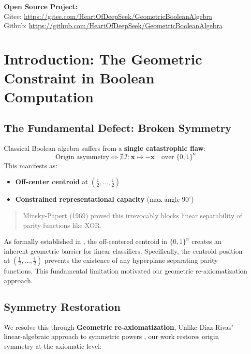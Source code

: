 \documentclass{article}
\begin{document}
\vspace{0.5em}
\noindent
\textbf{Open Source Project:} \\
\noindent
Gitee: \url{https://gitee.com/HeartOfDeepSeek/GeometricBooleanAlgebra} \\
\noindent
Github: \url{https://github.com/HeartOfDeepSeek/GeometricBooleanAlgebra}

\vspace{0.5em}




\section{Introduction: The Geometric Constraint in Boolean Computation}

\subsection{The Fundamental Defect: Broken Symmetry}
Classical Boolean algebra suffers from a \textbf{single catastrophic flaw}:
\begin{equation}
\text{Origin asymmetry} \iff \nexists \mathcal{I}: \mathbf{x} \mapsto -\mathbf{x} \quad \text{over } \{0,1\}^n
\end{equation}
This manifests as:
\begin{itemize}
\item \textbf{Off-center centroid} at $(\frac{1}{2},...,\frac{1}{2})$
\item \textbf{Constrained representational capacity} (max angle $90^\circ$)
\end{itemize}

\begin{quote}
Minsky-Papert (1969) proved this irrevocably blocks linear separability of parity functions like XOR.
\end{quote}

As formally established in \cite{minsky69perceptrons}, the off-centered centroid in $\{0,1\}^n$ creates an inherent geometric barrier for linear classifiers. Specifically, the centroid position at $(\frac{1}{2},...,\frac{1}{2})$ prevents the existence of any hyperplane separating parity functions. This fundamental limitation motivated our geometric re-axiomatization approach.

\subsection{Symmetry Restoration}
We resolve this through \textbf{Geometric re-axiomatization}, Unlike Diaz-Rivas' linear-algebraic approach to symmetric powers \cite{diaz2006symmetricbooleanalgebras}, our work restores origin symmetry at the axiomatic level:
\end{document}
